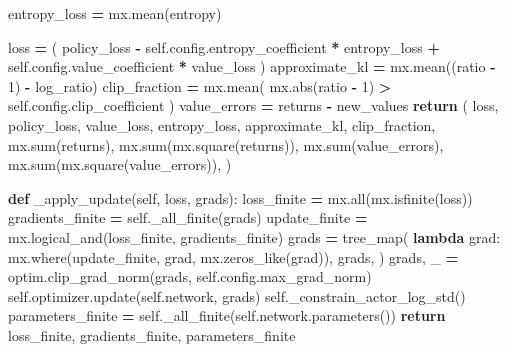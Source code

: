 \documentclass[
  american,
  11pt,
  letterpaper,
]{article}
\newenvironment{Shaded}{\begin{snugshade}}{\end{snugshade}}
\newcommand{\BuiltInTok}[1]{#1}
\newcommand{\ControlFlowTok}[1]{\textcolor[rgb]{0.13,0.29,0.53}{\textbf{#1}}}
\newcommand{\DecValTok}[1]{\textcolor[rgb]{0.00,0.00,0.81}{#1}}
\newcommand{\KeywordTok}[1]{\textcolor[rgb]{0.13,0.29,0.53}{\textbf{#1}}}
\newcommand{\NormalTok}[1]{#1}
\newcommand{\OperatorTok}[1]{\textcolor[rgb]{0.81,0.36,0.00}{\textbf{#1}}}
\newcommand{\VariableTok}[1]{\textcolor[rgb]{0.00,0.00,0.00}{#1}}
\renewenvironment{Shaded}{\par\smallskip}{\par\smallskip}
\begin{document}
\begin{Shaded}
\begin{Highlighting}[]
\NormalTok{        entropy\_loss }\OperatorTok{=}\NormalTok{ mx.mean(entropy)}

\NormalTok{        loss }\OperatorTok{=}\NormalTok{ (}
\NormalTok{            policy\_loss}
            \OperatorTok{{-}} \VariableTok{self}\NormalTok{.config.entropy\_coefficient }\OperatorTok{*}\NormalTok{ entropy\_loss}
            \OperatorTok{+} \VariableTok{self}\NormalTok{.config.value\_coefficient }\OperatorTok{*}\NormalTok{ value\_loss}
\NormalTok{        )}
\NormalTok{        approximate\_kl }\OperatorTok{=}\NormalTok{ mx.mean((ratio }\OperatorTok{{-}} \DecValTok{1}\NormalTok{) }\OperatorTok{{-}}\NormalTok{ log\_ratio)}
\NormalTok{        clip\_fraction }\OperatorTok{=}\NormalTok{ mx.mean(}
\NormalTok{            mx.}\BuiltInTok{abs}\NormalTok{(ratio }\OperatorTok{{-}} \DecValTok{1}\NormalTok{) }\OperatorTok{\textgreater{}} \VariableTok{self}\NormalTok{.config.clip\_coefficient}
\NormalTok{        )}
\NormalTok{        value\_errors }\OperatorTok{=}\NormalTok{ returns }\OperatorTok{{-}}\NormalTok{ new\_values}
        \ControlFlowTok{return}\NormalTok{ (}
\NormalTok{            loss,}
\NormalTok{            policy\_loss,}
\NormalTok{            value\_loss,}
\NormalTok{            entropy\_loss,}
\NormalTok{            approximate\_kl,}
\NormalTok{            clip\_fraction,}
\NormalTok{            mx.}\BuiltInTok{sum}\NormalTok{(returns),}
\NormalTok{            mx.}\BuiltInTok{sum}\NormalTok{(mx.square(returns)),}
\NormalTok{            mx.}\BuiltInTok{sum}\NormalTok{(value\_errors),}
\NormalTok{            mx.}\BuiltInTok{sum}\NormalTok{(mx.square(value\_errors)),}
\NormalTok{        )}

    \KeywordTok{def}\NormalTok{ \_apply\_update(}\VariableTok{self}\NormalTok{, loss, grads):}
\NormalTok{        loss\_finite }\OperatorTok{=}\NormalTok{ mx.}\BuiltInTok{all}\NormalTok{(mx.isfinite(loss))}
\NormalTok{        gradients\_finite }\OperatorTok{=} \VariableTok{self}\NormalTok{.\_all\_finite(grads)}
\NormalTok{        update\_finite }\OperatorTok{=}\NormalTok{ mx.logical\_and(loss\_finite, gradients\_finite)}
\NormalTok{        grads }\OperatorTok{=}\NormalTok{ tree\_map(}
            \KeywordTok{lambda}\NormalTok{ grad: mx.where(update\_finite, grad, mx.zeros\_like(grad)),}
\NormalTok{            grads,}
\NormalTok{        )}
\NormalTok{        grads, \_ }\OperatorTok{=}\NormalTok{ optim.clip\_grad\_norm(grads, }\VariableTok{self}\NormalTok{.config.max\_grad\_norm)}
        \VariableTok{self}\NormalTok{.optimizer.update(}\VariableTok{self}\NormalTok{.network, grads)}
        \VariableTok{self}\NormalTok{.\_constrain\_actor\_log\_std()}
\NormalTok{        parameters\_finite }\OperatorTok{=} \VariableTok{self}\NormalTok{.\_all\_finite(}\VariableTok{self}\NormalTok{.network.parameters())}
        \ControlFlowTok{return}\NormalTok{ loss\_finite, gradients\_finite, parameters\_finite}


\end{Highlighting}
\end{Shaded}
\end{document}
